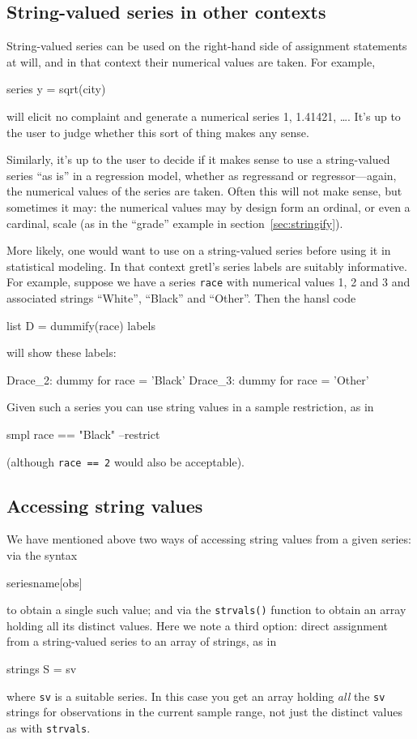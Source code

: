 \subsection{String-valued series in other contexts}

String-valued series can be used on the right-hand side of assignment
statements at will, and in that context their numerical values are
taken. For example,
%
\begin{code}
series y = sqrt(city)
\end{code}
%
will elicit no complaint and generate a numerical series 1, 1.41421,
\dots{}. It's up to the user to judge whether this sort of thing
makes any sense.

Similarly, it's up to the user to decide if it makes sense to use a
string-valued series ``as is'' in a regression model, whether as
regressand or regressor---again, the numerical values of the series
are taken. Often this will not make sense, but sometimes it may: the
numerical values may by design form an ordinal, or even a cardinal,
scale (as in the ``grade'' example in section~\ref{sec:stringify}).

More likely, one would want to use  on a string-valued
series before using it in statistical modeling. In that context
gretl's series labels are suitably informative. For example, suppose
we have a series \texttt{race} with numerical values 1, 2 and 3 and
associated strings ``White'', ``Black'' and ``Other''. Then the hansl
code
\begin{code}
list D = dummify(race)
labels
\end{code}
will show these labels:
\begin{code}
Drace_2: dummy for race = 'Black'
Drace_3: dummy for race = 'Other'
\end{code}

Given such a series you can use string values in a sample restriction,
as in
\begin{code}
smpl race == "Black" --restrict
\end{code}
(although \texttt{race == 2} would also be acceptable).

\subsection{Accessing string values}

We have mentioned above two ways of accessing string values from a
given series: via the syntax
\begin{code}
seriesname[obs]
\end{code}
to obtain a single such value; and via the \texttt{strvals()} function
to obtain an array holding all its distinct values. Here we note a
third option: direct assignment from a string-valued series to an
array of strings, as in
%
\begin{code}
strings S = sv
\end{code}
%
where \texttt{sv} is a suitable series. In this case you get an array
holding \textit{all} the \texttt{sv} strings for observations in the
current sample range, not just the distinct values as with
\texttt{strvals}.

